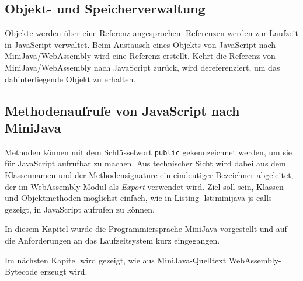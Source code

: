 \subsection{Objekt- und Speicherverwaltung}
Objekte werden über eine Referenz angesprochen. Referenzen werden zur Laufzeit in JavaScript verwaltet. Beim Austausch eines Objekts von JavaScript nach MiniJava/WebAssembly wird eine Referenz erstellt. Kehrt die Referenz von MiniJava/WebAssembly nach JavaScript zurück, wird dereferenziert, um das dahinterliegende Objekt zu erhalten.

\subsection{Methodenaufrufe von JavaScript nach MiniJava}
Methoden können mit dem Schlüsselwort \lstinline{public} gekennzeichnet werden, um sie für JavaScript aufrufbar zu machen. Aus technischer Sicht wird dabei aus dem Klassennamen und der Methodensignature ein eindeutiger Bezeichner abgeleitet, der im WebAssembly-Modul als \emph{Export} verwendet wird. Ziel soll sein, Klassen- und Objektmethoden möglichst einfach, wie in Listing \ref{lst:minijava-js-calls} gezeigt, in JavaScript aufrufen zu können.

\pagebreak


\vspace{4em}
In diesem Kapitel wurde die Programmiersprache MiniJava vorgestellt und auf die Anforderungen an das Laufzeitsystem kurz eingegangen.

Im nächsten Kapitel wird gezeigt, wie aus MiniJava-Quelltext WebAssembly-Bytecode erzeugt wird.
